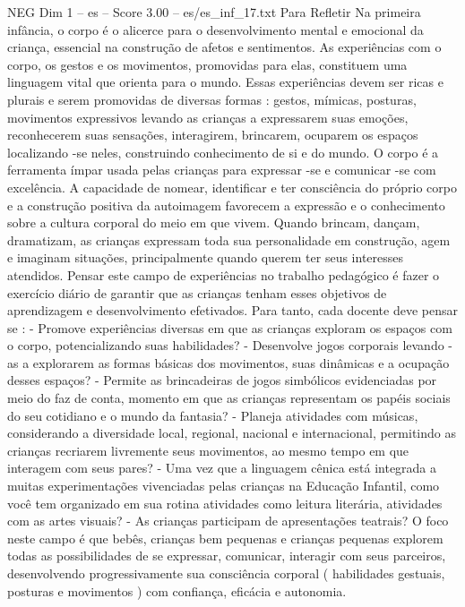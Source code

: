 \begin{textsample}{NEG Dim 1 – es – Score 3.00 – es/es\_inf\_17.txt}  \label{ex:f1_neg_096}
Para Refletir Na primeira infância, o corpo é o alicerce para o desenvolvimento mental e emocional da criança, essencial na construção de afetos e sentimentos.
As experiências com o corpo, os gestos e os movimentos, promovidas para elas, constituem uma linguagem vital que orienta para o mundo.
Essas experiências devem ser ricas e plurais e serem promovidas de diversas formas : gestos, mímicas, posturas, movimentos expressivos levando as crianças a expressarem suas emoções, reconhecerem suas sensações, interagirem, brincarem, ocuparem os espaços localizando -se neles, construindo conhecimento de si e do mundo.
O corpo é a ferramenta ímpar usada pelas crianças para expressar -se e comunicar -se com excelência.
A capacidade de nomear, identificar e ter consciência do próprio corpo e a construção positiva da autoimagem favorecem a expressão e o conhecimento sobre a cultura corporal do meio em que vivem.
Quando brincam, dançam, dramatizam, as crianças expressam toda sua personalidade em construção, agem e imaginam situações, principalmente quando querem ter seus interesses atendidos.
Pensar este campo de experiências no trabalho pedagógico é fazer o exercício diário de garantir que as crianças tenham esses objetivos de aprendizagem e desenvolvimento efetivados.
Para tanto, cada docente deve pensar se : - Promove experiências diversas em que as crianças exploram os espaços com o corpo, potencializando suas habilidades? - Desenvolve jogos corporais levando -as a explorarem as formas básicas dos movimentos, suas dinâmicas e a ocupação desses espaços? - Permite as brincadeiras de jogos simbólicos evidenciadas por meio do faz de conta, momento em que as crianças representam os papéis sociais do seu cotidiano e o mundo da fantasia? - Planeja atividades com músicas, considerando a diversidade local, regional, nacional e internacional, permitindo as crianças recriarem livremente seus movimentos, ao mesmo tempo em que interagem com seus pares? - Uma vez que a linguagem cênica está integrada a muitas experimentações vivenciadas pelas crianças na Educação Infantil, como você tem organizado em sua rotina atividades como leitura literária, atividades com as artes visuais? - As crianças participam de apresentações teatrais?
O foco neste campo é que bebês, crianças bem pequenas e crianças pequenas explorem todas as possibilidades de se expressar, comunicar, interagir com seus parceiros, desenvolvendo progressivamente sua consciência corporal ( habilidades gestuais, posturas e movimentos ) com confiança, eficácia e autonomia.

\end{textsample}
